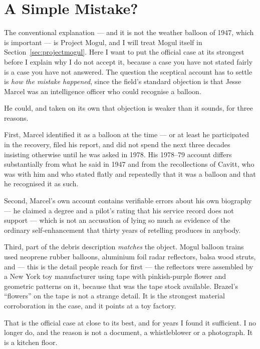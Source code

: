 \section{A Simple Mistake?}\label{sec:simplemistake}

The conventional explanation --- and it is not the weather balloon of 1947, which is important ---
is Project Mogul, and I will treat Mogul itself in Section~\ref{sec:projectmogul}. Here I want to put
the official case at its strongest before I explain why I do not accept it, because a case you have
not stated fairly is a case you have not answered. The question the sceptical account has to settle is
\emph{how the mistake happened}, since the field's standard objection is that Jesse Marcel was an
intelligence officer who could recognise a balloon.

He could, and taken on its own that objection is weaker than it sounds, for three reasons.

First, Marcel identified it as a balloon at the time --- or at least he participated in the
recovery, filed his report, and did not spend the next three decades insisting otherwise until he
was asked in 1978. His 1978--79 account differs substantially from what he said in 1947 and from
the recollections of Cavitt, who was with him and who stated flatly and repeatedly that it was a
balloon and that he recognised it as such.

Second, Marcel's own account contains verifiable errors about his own biography --- he claimed a
degree and a pilot's rating that his service record does not support --- which is not an accusation
of lying so much as evidence of the ordinary self-enhancement that thirty years of retelling
produces in anybody.

Third, part of the debris description \emph{matches} the object. Mogul balloon trains used
neoprene rubber balloons, aluminium foil radar reflectors, balsa wood struts, and --- this is the
detail people reach for first --- the reflectors were assembled by a New York toy manufacturer
using tape with pinkish-purple flower and geometric patterns on it, because that was the tape
stock available. Brazel's ``flowers'' on the tape is not a strange detail. It is the strongest
material corroboration in the case, and it points at a toy factory.

That is the official case at close to its best, and for years I found it sufficient. I no longer do,
and the reason is not a document, a whistleblower or a photograph. It is a kitchen floor.

